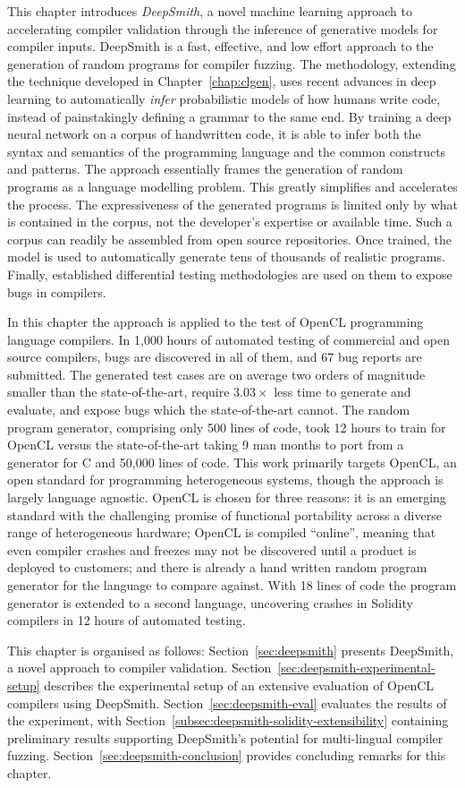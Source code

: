 This chapter introduces \emph{DeepSmith}, a novel machine learning approach to accelerating compiler validation through the inference of generative models for compiler inputs. DeepSmith is a fast, effective, and low effort approach to the generation of random programs for compiler fuzzing. The methodology, extending the technique developed in Chapter~\ref{chap:clgen}, uses recent advances in deep learning to automatically \emph{infer} probabilistic models of how humans write code, instead of painstakingly defining a grammar to the same end. By training a deep neural network on a corpus of handwritten code, it is able to infer both the syntax and semantics of the programming language and the common constructs and patterns. The approach essentially frames the generation of random programs as a language modelling problem. This greatly simplifies and accelerates the process. The expressiveness of the generated programs is limited only by what is contained in the corpus, not the developer's expertise or available time. Such a corpus can readily be assembled from open source repositories. Once trained, the model is used to automatically generate tens of thousands of realistic programs. Finally, established differential testing methodologies are used on them to expose bugs in compilers.

In this chapter the approach is applied to the test of OpenCL programming language compilers. In 1,000 hours of automated testing of commercial and open source compilers, bugs are discovered in all of them, and 67 bug reports are submitted. The generated test cases are on average two orders of magnitude smaller than the state-of-the-art, require $3.03\times$ less time to generate and evaluate, and expose bugs which the state-of-the-art cannot. The random program generator, comprising only 500 lines of code, took 12 hours to train for OpenCL versus the state-of-the-art taking 9 man months to port from a generator for C and 50,000 lines of code.  This work primarily targets OpenCL, an open standard for programming heterogeneous systems, though the approach is largely language agnostic. OpenCL is chosen for three reasons: it is an emerging standard with the challenging promise of functional portability across a diverse range of heterogeneous hardware; OpenCL is compiled ``online'', meaning that even compiler crashes and freezes may not be discovered until a product is deployed to customers; and there is already a hand written random program generator for the language to compare against. With 18 lines of code the program generator is extended to a second language, uncovering crashes in Solidity compilers in 12 hours of automated testing.

This chapter is organised as follows:  Section~\ref{sec:deepsmith} presents DeepSmith, a novel approach to compiler validation. Section~\ref{sec:deepsmith-experimental-setup} describes the experimental setup of an extensive evaluation of OpenCL compilers using DeepSmith. Section~\ref{sec:deepsmith-eval} evaluates the results of the experiment, with Section~\ref{subsec:deepsmith-solidity-extensibility} containing preliminary results supporting DeepSmith's potential for multi-lingual compiler fuzzing. Section~\ref{sec:deepsmith-conclusion} provides concluding remarks for this chapter.
